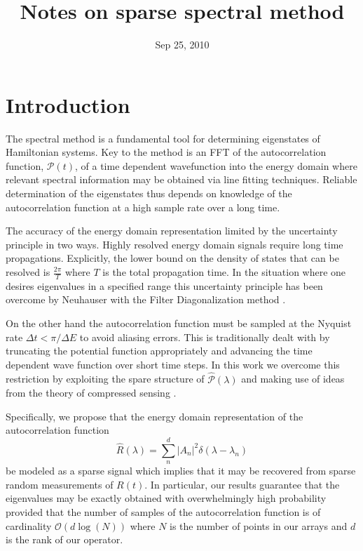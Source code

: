\documentclass[12pt]{amsart}
\title{Notes on sparse spectral method}
\date{Sep 25, 2010}
\theoremstyle{remark}
\begin{document}
\maketitle

\section{Introduction}

The spectral method is a fundamental tool for determining eigenstates of Hamiltonian systems. Key to the method is an FFT of the autocorrelation function, $\mathcal{P}(t)$, of a time dependent wavefunction into the energy domain where relevant spectral information may be obtained via line fitting techniques. Reliable determination of the eigenstates thus depends on knowledge of the autocorrelation function at a high sample rate over a long time.

The accuracy of the energy domain representation limited by the uncertainty principle in two ways. Highly resolved energy domain signals require long time propagations. Explicitly, the lower bound on the density of states that can be resolved is $\frac{2 \pi}{T}$ where $T$ is the total propagation time. In the situation where one desires eigenvalues in a specified range this uncertainty principle has been overcome by Neuhauser with the Filter Diagonalization method \cite{Wall1995} \cite{Neuhauser1994} \cite{Mandelshtam2001}.

On the other hand the autocorrelation function must be sampled at the Nyquist rate $ \Delta t < \pi / \Delta E $ to avoid aliasing errors. This is traditionally dealt with by truncating the potential function appropriately and advancing the time dependent wave function over short time steps. In this work we overcome this restriction by exploiting the spare structure of $\hat{\mathcal{P}}(\lambda)$ and making use of ideas from the theory of compressed sensing \cite{Candes2006}.

Specifically, we propose that the energy domain representation of the autocorrelation function
\begin{equation}
\hat{R}(\lambda) = \sum_n^d |A_n|^2 \delta(\lambda-\lambda_n)
\end{equation}
be modeled as a sparse signal which implies that it may be recovered from sparse random measurements of $R(t)$. In particular, our results guarantee that the eigenvalues may be exactly obtained with overwhelmingly high probability provided that the number of samples of the autocorrelation function is of cardinality $\mathcal{O}(d \log(N))$ where $N$ is the number of points in our arrays and $d$ is the rank of our operator.
\end{document}
